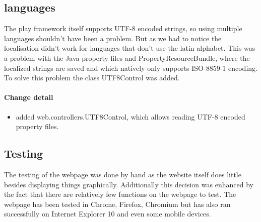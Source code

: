 \subsection{languages}
The play framework itself supports UTF-8 encoded strings, so using multiple languages shouldn't have been a problem. 
But as we had to notice the localisation didn't work for languages that don't use the latin alphabet.
This was a problem with the Java property files and PropertyResourceBundle, where the localized strings are saved and which natively only
supports ISO-8859-1 encoding.
To solve this problem the class UTF8Control was added.

\paragraph{Change detail}
\begin{itemize}
  \item added web.controllers.UTF8Control, which allows reading UTF-8 encoded property files.
\end{itemize}

\pagebreak[4]
\subsection{Testing}
The testing of the webpage was done by hand as the website itself does little besides displaying things graphically.
Additionally this decision was enhanced by the fact that there are relatively few functions on the webpage to test.
The webpage has been tested in Chrome, Firefox, Chromium but has also ran successfully 
on Internet Explorer 10 and even some mobile devices.
